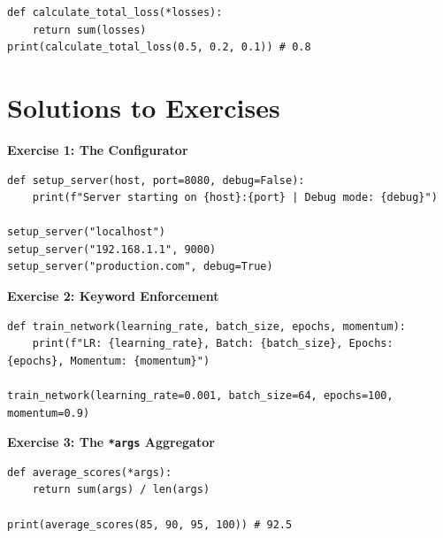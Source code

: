 \begin{lstlisting}
def calculate_total_loss(*losses):
    return sum(losses)
print(calculate_total_loss(0.5, 0.2, 0.1)) # 0.8
\end{lstlisting}


\section{Solutions to Exercises}

\textbf{Exercise 1: The Configurator}
\begin{lstlisting}
def setup_server(host, port=8080, debug=False):
    print(f"Server starting on {host}:{port} | Debug mode: {debug}")

setup_server("localhost")
setup_server("192.168.1.1", 9000)
setup_server("production.com", debug=True)
\end{lstlisting}

\vspace{1em}
\textbf{Exercise 2: Keyword Enforcement}
\begin{lstlisting}
def train_network(learning_rate, batch_size, epochs, momentum):
    print(f"LR: {learning_rate}, Batch: {batch_size}, Epochs: {epochs}, Momentum: {momentum}")

train_network(learning_rate=0.001, batch_size=64, epochs=100, momentum=0.9)
\end{lstlisting}

\vspace{1em}
\textbf{Exercise 3: The \texttt{*args} Aggregator}
\begin{lstlisting}
def average_scores(*args):
    return sum(args) / len(args)

print(average_scores(85, 90, 95, 100)) # 92.5
\end{lstlisting}
